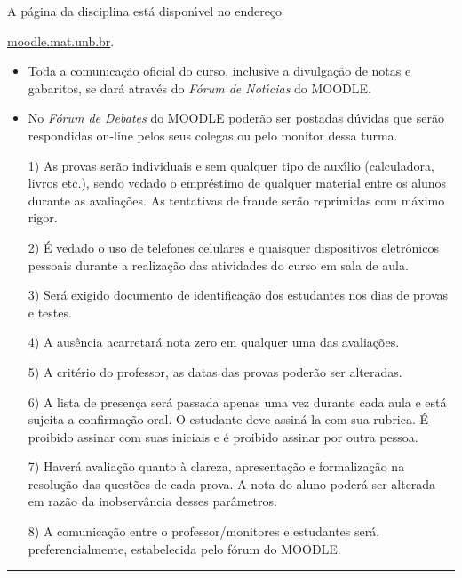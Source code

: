 \documentclass[12pt]{article}
\begin{document}
\vspace{0.5cm}
 A p\'agina da disciplina est\'a dispon{\'\i}vel no endere\c{c}o
\begin{center}
    \url{moodle.mat.unb.br}.
\end{center}


\begin{itemize}
\item Toda a comunica\c{c}\~{a}o oficial do curso, inclusive a divulga\c{c}\~{a}o de
notas e gabaritos, se dar\'{a} atrav\'{e}s do {\em F\'{o}rum de Not\'{\i}cias} do
MOODLE.\vspace{-0.20cm}
\item No {\em F\'{o}rum de Debates} do MOODLE poder\~{a}o ser
postadas d\'{u}vidas que ser\~{a}o respondidas on-line pelos seus
colegas ou pelo monitor dessa turma.
\end{itemize}


\begin{itemize}
\item[1)] As provas ser\~{a}o individuais e sem qualquer tipo de
aux\'{\i}lio (calculadora, livros etc.), sendo vedado o empr\'{e}stimo de
qualquer material entre os alunos durante as avalia\c{c}\~{o}es. As
tentativas de fraude ser\~{a}o reprimidas com m\'{a}ximo rigor.

\item[2)] \'{E} vedado o uso de telefones celulares e quaisquer dispositivos 
eletr\^{o}nicos pessoais durante a realiza\c{c}\~{a}o das atividades do curso 
em sala de aula.

\item[3)] Ser\'{a} exigido documento de identifica\c{c}\~{a}o dos estudantes nos
dias de provas e testes.

\item[4)] A aus\^{e}ncia acarretar\'{a} nota zero em qualquer uma das
avalia\c{c}\~{o}es.

\item[5)] A crit\'{e}rio do professor, as datas das provas poder\~{a}o
ser alteradas.

\item[6)] A lista de presen\c{c}a ser\'{a} passada apenas uma vez
durante cada aula e est\'{a} sujeita a confirma\c{c}\~{a}o oral. O
estudante deve assin\'{a}-la com sua rubrica. {\'E} proibido assinar
com suas iniciais e \'{e} proibido assinar por outra pessoa.

\item[7)] Haver{\'a} avalia{\c c}{\~a}o quanto {\`a} clareza, apresenta{\c
c}{\~a}o e formaliza{\c c}{\~a}o na  resolu{\c c}{\~a}o das quest{\~o}es de
cada prova. A nota do aluno poder{\'a} ser alterada em raz{\~a}o da
inobserv{\^a}ncia desses par{\^a}metros.

\item[8)] A comunica\c{c}\~ao entre o professor/monitores e estudantes ser\'a, preferencialmente,
 estabelecida pelo f\'orum do MOODLE.
\end{itemize}

\vfill
\hrule
\end{document}
